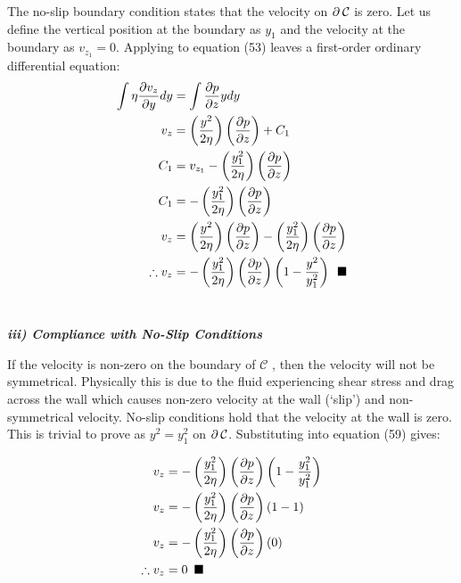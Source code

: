 \documentclass[titlepage]{article}
\begin{document}
        \newpage
        \noindent The no-slip boundary condition states that the velocity on $\partial\hspace*{2pt}\mathcal{C}$ is zero. Let us define the vertical position at the boundary as $y_{1}$ and the velocity at the boundary as $v_{z_{1}}=0$. Applying to equation (53) leaves a first-order ordinary differential equation:
        \begin{align}
            \int{\eta\displaystyle\frac{\partial{v_{z}}}{\partial{y}}dy}&=\int{\displaystyle\frac{\partial{p}}{\partial{z}}ydy} \\
            v_{z}&= \left(\displaystyle\frac{y^2}{2\eta}\right)\left(\displaystyle\frac{\partial{p}}{\partial{z}}\right) + C_{1} \\
            C_{1} &= v_{z_{1}}-\left(\displaystyle\frac{y_{1}^2}{2\eta}\right)\left(\displaystyle\frac{\partial{p}}{\partial{z}}\right) \\
            C_{1}  &=-\left(\displaystyle\frac{y_{1}^2}{2\eta}\right)\left(\displaystyle\frac{\partial{p}}{\partial{z}}\right)\\
            v_{z}  &= \left(\displaystyle\frac{y^2}{2\eta}\right)\left(\displaystyle\frac{\partial{p}}{\partial{z}}\right) -\left(\displaystyle\frac{y_{1}^2}{2\eta}\right)\left(\displaystyle\frac{\partial{p}}{\partial{z}}\right) \\
            \therefore  v_{z} &= -\left(\displaystyle\frac{y_{1}^2}{2\eta}\right)\left(\displaystyle\frac{\partial{p}}{\partial{z}}\right)\left(1-\displaystyle\frac{y^2}{y_{1}^2}\right)\hspace*{5pt}\blacksquare
        \end{align}
    \endgroup \\

    \begin{center}
        \textbf{\emph{iii) Compliance with No-Slip Conditions}}
    \end{center}
    If the velocity is non-zero on the boundary of $\mathcal{C}$ , then the velocity will not be symmetrical. Physically this is due to the fluid experiencing shear stress and drag across the wall which causes non-zero velocity at the wall (`slip') and non-symmetrical velocity. No-slip conditions hold that the velocity at the wall is zero. This is trivial to prove as $y^2=y_{1}^2$ on $\partial\hspace*{2pt}\mathcal{C}$. Substituting into equation  (59) gives: 

    \begin{align}
        v_{z} &= -\left(\displaystyle\frac{y_{1}^2}{2\eta}\right)\left(\displaystyle\frac{\partial{p}}{\partial{z}}\right)\left(1-\displaystyle\frac{y_{1}^2}{y_{1}^2}\right) \\
        v_{z} &= -\left(\displaystyle\frac{y_{1}^2}{2\eta}\right)\left(\displaystyle\frac{\partial{p}}{\partial{z}}\right)\left(1-1\right) \\
        v_{z} &= -\left(\displaystyle\frac{y_{1}^2}{2\eta}\right)\left(\displaystyle\frac{\partial{p}}{\partial{z}}\right)\left(0\right) \\
        \therefore v_{z} &= 0 \hspace*{5pt} \blacksquare
    \end{align}
\end{document}
